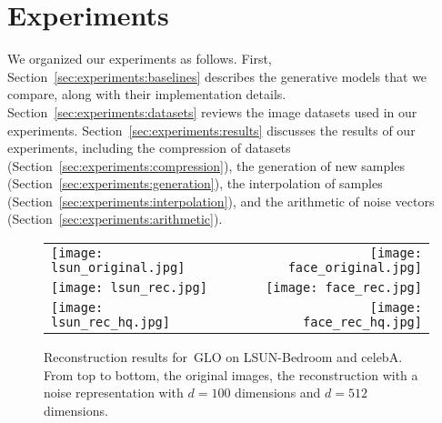 \documentclass{article}
\newcommand{\GNAT}{GLO}
\begin{document}
\section{Experiments}\label{sec:experiments}

We organized our experiments as follows. First,
Section~\ref{sec:experiments:baselines} describes the generative models that we
compare, along with their implementation details. Section~\ref{sec:experiments:datasets} reviews
the image datasets used in our experiments.
Section~\ref{sec:experiments:results} discusses the results of our experiments,
including the compression of datasets
(Section~\ref{sec:experiments:compression}), the generation of new samples
(Section~\ref{sec:experiments:generation}), the interpolation of samples
(Section~\ref{sec:experiments:interpolation}), and the arithmetic of noise
vectors (Section~\ref{sec:experiments:arithmetic}).

\begin{figure}[t]
    \begin{center}
      \begin{tabular}{lr}
        \texttt{[image: lsun\_original.jpg]}&
        \texttt{[image: face\_original.jpg]}
        \\
        \texttt{[image: lsun\_rec.jpg]}&
        \texttt{[image: face\_rec.jpg]}
        \\
        \texttt{[image: lsun\_rec\_hq.jpg]}&
        \texttt{[image: face\_rec\_hq.jpg]}
      \end{tabular}
    \end{center}
    \caption{Reconstruction results for~\GNAT{} on LSUN-Bedroom and celebA. From
    top to bottom, the original images, the reconstruction with a noise
    representation with $d=100$ dimensions and $d=512$ dimensions.}
    \label{fig:qua}
\end{figure}
\end{document}
